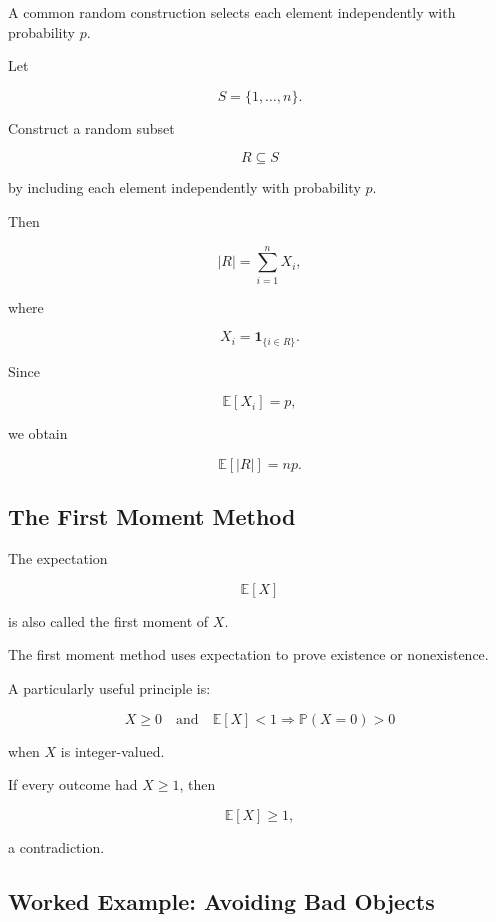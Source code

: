 A common random construction selects each element independently with
probability \(p\).

Let

\[
S=\{1,\ldots,n\}.
\]

Construct a random subset

\[
R\subseteq S
\]

by including each element independently with probability \(p\).

Then

\[
|R|
=
\sum_{i=1}^{n}X_i,
\]

where

\[
X_i
=
\mathbf{1}_{\{i\in R\}}.
\]

Since

\[
\mathbb{E}[X_i]=p,
\]

we obtain

\[
\boxed{
\mathbb{E}[|R|]=np.
}
\]

\subsection{The First Moment Method}
\label{subsec:first-moment-method}

The expectation

\[
\mathbb{E}[X]
\]

is also called the first moment of \(X\).

The first moment method uses expectation to prove existence or
nonexistence.

A particularly useful principle is:

\[
\boxed{
X\geq0
\quad\text{and}\quad
\mathbb{E}[X]<1
\Longrightarrow
\mathbb{P}(X=0)>0
}
\]

when \(X\) is integer-valued.

If every outcome had \(X\geq1\), then

\[
\mathbb{E}[X]\geq1,
\]

a contradiction.

\subsection{Worked Example: Avoiding Bad Objects}
\label{subsec:worked-first-moment}

